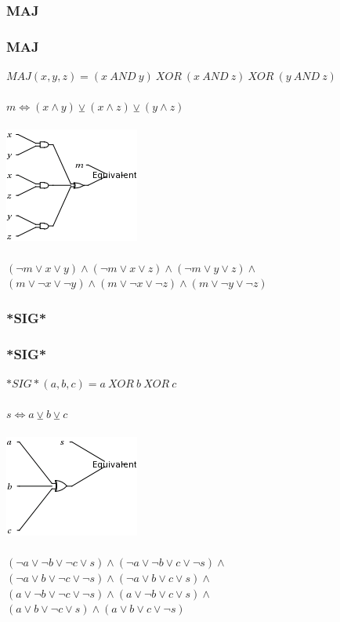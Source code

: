 \documentclass{beamer}
\begin{document}
\subsubsection{MAJ}
  \begin{frame}
    \frametitle{MAJ}
    $ MAJ( x, y, z) = (x~AND~y)~XOR~(x~AND~z)~XOR~(y~AND~z) $\\
    ~\\
    $ m \Leftrightarrow (x \wedge y) \veebar (x \wedge z) \veebar (y \wedge z) $\\
    ~\\
    \includegraphics[scale=0.5]{maj.png}\\
    ~\\
    $ (\neg m \vee x \vee y) \wedge  (\neg m \vee x \vee z) \wedge (\neg m \vee y \vee z) \wedge $\\
    $ (m \vee \neg x \vee \neg y) \wedge (m \vee \neg x \vee \neg z) \wedge (m \vee \neg y \vee \neg z) $
    \end{frame}
\subsubsection{*SIG*}
  \begin{frame}
    \frametitle{*SIG*}
    $ *SIG*(a, b, c) = a~XOR~b~XOR~c $\\
    ~\\
    $ s \Leftrightarrow a \veebar b \veebar c $\\
    ~\\
    \includegraphics[scale=0.5]{sig.png}\\
    ~\\
    $ (\neg a \vee \neg b \vee \neg c \vee s) \wedge (\neg a \vee \neg b \vee c \vee \neg s) \wedge $\\
    $ (\neg a \vee b \vee \neg c \vee \neg s) \wedge (\neg a \vee b \vee c \vee s) \wedge $\\
    $ (a \vee \neg b \vee \neg c \vee \neg s) \wedge (a \vee \neg b \vee c \vee s) \wedge $\\
    $ (a \vee b \vee \neg c \vee s) \wedge (a \vee b \vee c \vee \neg s) $
  \end{frame}
\end{document}
